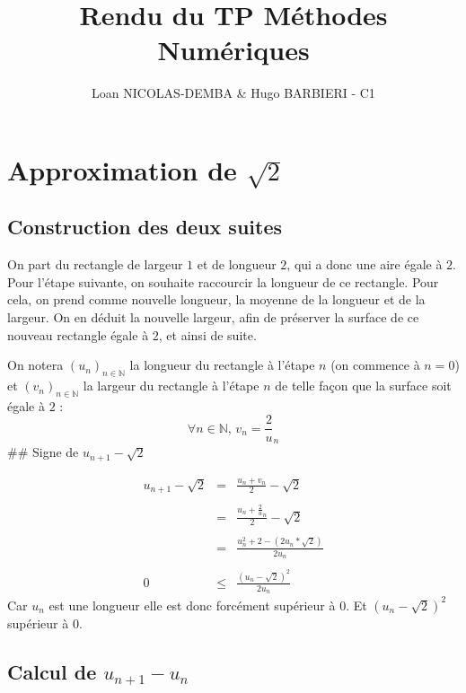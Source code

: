 \documentclass[
]{article}
\title{Rendu du TP Méthodes Numériques}
\author{Loan NICOLAS-DEMBA \& Hugo BARBIERI - C1}
\date{}
\begin{document}
\maketitle

\hypertarget{approximation-de-sqrt2}{%
\section{\texorpdfstring{Approximation de
\(\sqrt{2}\)}{Approximation de \textbackslash sqrt\{2\}}}\label{approximation-de-sqrt2}}

\hypertarget{construction-des-deux-suites}{%
\subsection{Construction des deux
suites}\label{construction-des-deux-suites}}

On part du rectangle de largeur \(1\) et de longueur \(2\), qui a donc
une aire égale à \(2\). Pour l'étape suivante, on souhaite raccourcir la
longueur de ce rectangle. Pour cela, on prend comme nouvelle longueur,
la moyenne de la longueur et de la largeur. On en déduit la nouvelle
largeur, afin de préserver la surface de ce nouveau rectangle égale à
\(2\), et ainsi de suite.

On notera \((u_n)_{n\in\mathbb N}\) la longueur du rectangle à l'étape
\(n\) (on commence à \(n=0\)) et \((v_n)_{n\in\mathbb N}\) la largeur du
rectangle à l'étape \(n\) de telle façon que la surface soit égale à
\(2\) : \[
\forall n\in \mathbb N,\, v_n= \frac2u_n
\] \#\# Signe de \(u_{n+1}-\sqrt{2}\)

\[
\begin{eqnarray*}
u_{n+1}-\sqrt{2} & = & \frac{u_n + v_n}2 - \sqrt{2}  \\\\ 
                & = & \frac{u_n + \frac2u_n}2 - \sqrt{2}    \\\\
                & = & \frac{u_n^2+2-(2u_n*\sqrt{2})}{2u_n} \\\\
               0 & \leq & \frac{(u_n-\sqrt{2})^2}{2u_n}
\end{eqnarray*}
\] Car \(u_n\) est une longueur elle est donc forcément supérieur à 0.
Et \((u_n-\sqrt{2})^2\) supérieur à 0.

\hypertarget{calcul-de-u_n1-u_n}{%
\subsection{\texorpdfstring{Calcul de
\(u_{n+1}-u_n\)}{Calcul de u\_\{n+1\}-u\_n}}\label{calcul-de-u_n1-u_n}}
\end{document}
